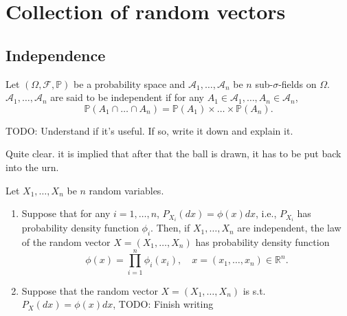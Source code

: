 \chapter{Collection of random vectors}%
\label{cha:Collection of random vectors}

\section{Independence}%
\label{sec:Independence}

\begin{definition}
    \label{def:11.1}
    Let $(\Omega, \mathcal{F}, \mathbb{P})$ be a probability space and $\mathcal{A}_1, \ldots,
    \mathcal{A}_n$ be $n$ sub-$\sigma$-fields on $\Omega$. $\mathcal{A}_1, \ldots, \mathcal{A}_n$
    are said to be independent if for any $A_1 \in \mathcal{A}_1, \ldots, A_n \in \mathcal{A}_n$,
    \[
    \mathbb{P}(A_1 \cap \ldots \cap A_n) = \mathbb{P}(A_1)\times \ldots \times \mathbb{P}(A_n)
    .\] 
\end{definition}

\begin{definition}[]
    \label{def:11.2}
    TODO: Understand if it's useful. If so, write it down and explain it.
\end{definition}

\begin{example}[]
    \label{ex:11.1}
    Quite clear. it is implied that after that the ball is drawn, it has to be put back into
    the urn.
\end{example}

\begin{proposition}[]
    \label{prop:11.4}
    Let $X_1, \ldots, X_n $ be $n $ random variables.
    \begin{enumerate}[label=(\roman*)]
        \item Suppose that for any $i=1, \ldots, n $, $P_{X_i}(dx) = \phi(x)dx$, i.e.,
            $P_{X_i} $ has probability density function $\phi_i $. Then, if $X_1, \ldots, X_n $ 
            are independent, the law of the random vector $X = (X_1, \ldots, X_n) $ has 
            probability density function
            \[
            \phi(x) = \prod_{i=1}^{n} \phi_i(x_{i}), 
            \quad x=(x_1, \ldots, x_{n}) \in \mathbb{R}^{n}
            .\] 
        \item Suppose that the random vector $X=(X_1, \ldots, X_n) $ is s.t.
            $P_X(dx) = \phi(x)dx $, TODO: Finish writing

    \end{enumerate}
\end{proposition}

